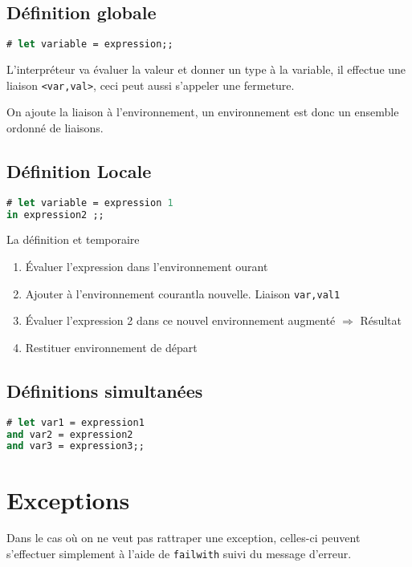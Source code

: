 \subsection{Définition globale}
\begin{lstlisting}[language=Caml, caption=Définition de variable]
# let variable = expression;;
\end{lstlisting}
L'interpréteur va évaluer la valeur et donner un type à la variable, il effectue une liaison \texttt{<var,val>}, ceci peut aussi s'appeler une
fermeture.

On ajoute la liaison à l'environnement, un environnement est donc un ensemble ordonné de liaisons.
\subsection{Définition Locale}
\begin{lstlisting}[language=Caml, caption=Définition de variable]
# let variable = expression 1
in expression2 ;;
\end{lstlisting}
La définition et temporaire
\begin{enumerate}
	\item Évaluer l'expression dans l'environnement ourant
	\item Ajouter à l'environnement courantla nouvelle. Liaison \texttt{var,val1}
	\item Évaluer l'expression 2 dans ce nouvel environnement augmenté $\Rightarrow$ Résultat
	\item Restituer environnement de départ
\end{enumerate}

\subsection{Définitions simultanées}
\begin{lstlisting}[language=Caml, caption=Définition de variable]
# let var1 = expression1 
and var2 = expression2
and var3 = expression3;;
\end{lstlisting}

\section{Exceptions}
Dans le cas où on ne veut pas rattraper une exception, celles-ci peuvent s'effectuer simplement à l'aide de \texttt{failwith} suivi du message
d'erreur.

